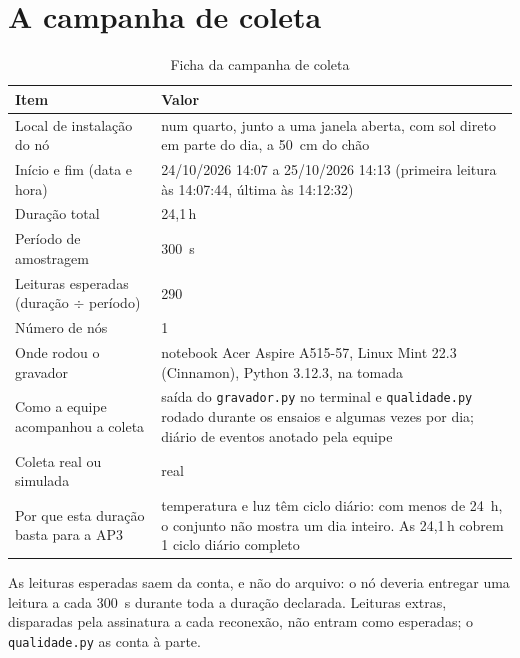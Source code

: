\section{A campanha de coleta}
\label{sec:campanha}
\rubricaRobustez

\begin{table}[H]
\centering
\caption{Ficha da campanha de coleta}
\label{tab:campanha}
\footnotesize
\begin{tabular}{@{}L{5.0cm}L{9.0cm}@{}}
\toprule
\textbf{Item} & \textbf{Valor} \\
\midrule
Local de instalação do nó                & num quarto, junto a uma janela aberta, com sol direto em parte do dia, a \SI{50}{\centi\metre} do chão \\
Início e fim (data e hora)               & 24/10/2026 14:07 a 25/10/2026 14:13 (primeira leitura às 14:07:44, última às 14:12:32) \\
Duração total                            & 24,1\,h \\
Período de amostragem                    & \SI{300}{\second} \\
Leituras esperadas (duração $\div$ período) & 290 \\
Número de nós                            & 1 \\
Onde rodou o gravador                    & notebook Acer Aspire A515-57, Linux Mint 22.3 (Cinnamon), Python 3.12.3, na tomada \\
Como a equipe acompanhou a coleta        & saída do \texttt{gravador.py} no terminal e \texttt{qualidade.py} rodado durante os ensaios e algumas vezes por dia; diário de eventos anotado pela equipe \\
Coleta real ou simulada                  & real \\
Por que esta duração basta para a AP3    & temperatura e luz têm ciclo diário: com menos de \SI{24}{\hour}, o conjunto não mostra um dia inteiro. As 24,1\,h cobrem 1 ciclo diário completo \\
\bottomrule
\end{tabular}
\end{table}

As leituras esperadas saem da conta, e não do arquivo: o nó deveria
entregar uma leitura a cada \SI{300}{\second} durante toda a duração
declarada. Leituras extras, disparadas pela assinatura a cada reconexão,
não entram como esperadas; o \texttt{qualidade.py} as conta à parte.

